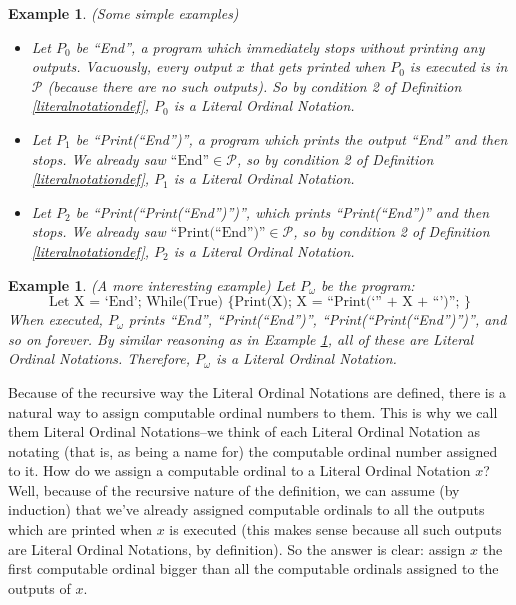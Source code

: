 \documentclass[runningheads]{llncs}
\newtheorem{myexample}[mytheorem]{Example}
\begin{document}
\begin{myexample}
\label{simpleexamples}
(Some simple examples)
    \begin{itemize}
    \item
    Let $P_0$ be ``End'', a program which immediately stops without printing any outputs.
    Vacuously, every output $x$ that gets printed when $P_0$ is executed is in $\mathcal P$
    (because there are no such outputs). So by condition 2 of
    Definition \ref{literalnotationdef}, $P_0$ is a Literal Ordinal Notation.
    \item
    Let $P_1$ be ``Print(``End'')'', a program which prints the output ``End'' and then
    stops. We already saw $\mbox{``End''}\in\mathcal P$, so by condition 2 of
    Definition \ref{literalnotationdef}, $P_1$ is a Literal Ordinal Notation.
    \item
    Let $P_2$ be ``Print(``Print(``End'')'')'', which prints ``Print(``End'')'' and then
    stops. We already saw $\mbox{``Print(``End'')''}\in\mathcal P$, so by condition 2
    of Definition \ref{literalnotationdef}, $P_2$ is a Literal Ordinal Notation.
    \end{itemize}
\end{myexample}

\begin{myexample}
\label{omegaexample}
(A more interesting example)
    Let $P_\omega$ be the program:
    \[
        \mbox{Let X = `End'; While(True) \{ Print(X); X = ``Print(`'' + X + ``')''; \}}
    \]
    When executed, $P_\omega$ prints ``End'', ``Print(``End'')'',
    ``Print(``Print(``End'')'')'', and so on forever. By similar reasoning as
    in Example \ref{simpleexamples}, all of these are Literal Ordinal Notations.
    Therefore, $P_\omega$ is a Literal Ordinal Notation.
\end{myexample}

Because of the recursive way the Literal Ordinal Notations are defined, there is a
natural way to assign computable ordinal numbers to them. This is why we call them
Literal Ordinal Notations--we think of each Literal Ordinal Notation as notating
(that is, as being a name for) the computable ordinal number assigned to it.
How do we assign a computable ordinal to a Literal Ordinal Notation $x$? Well, because
of the recursive nature of the definition, we can assume (by induction) that we've
already assigned computable ordinals to all the outputs which are printed when $x$
is executed (this makes sense because all such outputs are Literal Ordinal Notations,
by definition). So the answer is clear: assign $x$ the first computable ordinal bigger
than all the computable ordinals assigned to the outputs of $x$.
\end{document}
